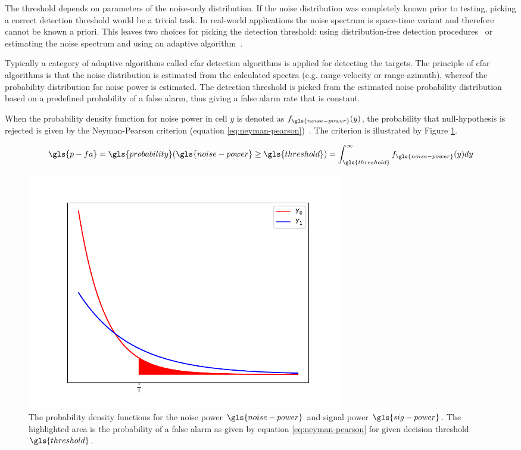 The threshold depends on parameters of the noise-only distribution.
If the noise distribution was completely known prior to testing,
picking a correct detection threshold would be a trivial task.
In real-world applications the noise spectrum is space-time variant and therefore cannot be known a priori.
This leaves two choices for picking the detection threshold:
using distribution-free detection procedures~\cite{distribution-free-detection} 
or estimating the noise spectrum and using an adaptive algorithm~\cite{mean-level-detection}.

Typically a category of adaptive algorithms called \gls{cfar} detection algorithms is applied for detecting the targets.
The principle of \gls{cfar} algorithms is that the noise distribution is estimated from the calculated spectra (e.g. range-velocity or range-azimuth),
whereof the probability distribution for noise power is estimated.
The detection threshold is picked from the estimated noise probability distribution
based on a predefined probability of a false alarm, thus giving a false alarm rate that is constant.

When the probability density function for noise power in cell $y$ is denoted as $f_{\gls{noise-power}}(y)$,
the probability that \gls{null-hypothesis} is rejected
is given by the Neyman-Pearson criterion (equation \ref{eq:neyman-pearson})~\cite{fast-two-dimensional-cfar, neyman-pearson}.
The criterion is illustrated by Figure \ref{fig:neyman-pearson}.

\begin{equation}
    \label{eq:neyman-pearson}
    \gls{p-fa} = \gls{probability}(\gls{noise-power} \ge \gls{threshold}) = \int_{\gls{threshold}}^{\infty} f_{\gls{noise-power}}(y)dy
\end{equation}

\begin{figure}
    \centering
    \includegraphics[width=0.67\textwidth]{fig/4/neyman-pearson.pdf}
    \caption{
        The probability density functions for the noise power $\gls{noise-power}$ and signal power $\gls{sig-power}$.
        The highlighted area is the probability of a false alarm as given by equation \ref{eq:neyman-pearson}
        for given decision threshold $\gls{threshold}$.
    }
    \label{fig:neyman-pearson}
\end{figure}

